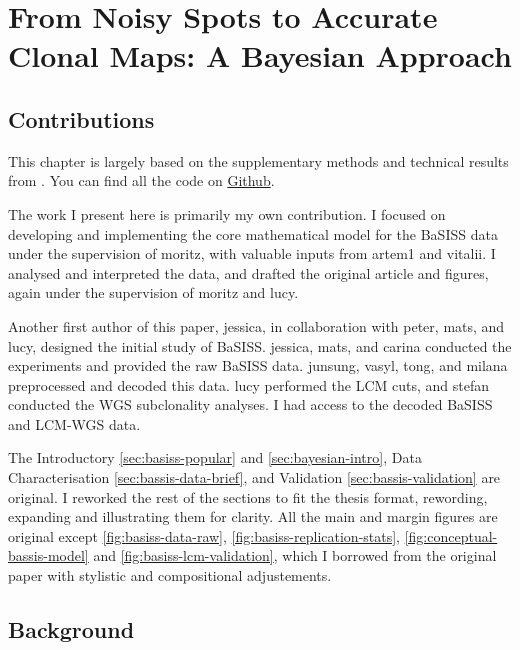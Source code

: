 \chapter{From Noisy Spots to Accurate Clonal Maps: A Bayesian Approach}

\section*{Contributions}
This chapter is largely based on the supplementary methods and technical results from . You can find all the code on \href{https://github.com/gerstung-lab/BaSISS}{Github}.

The work I present here is primarily my own contribution. I focused on developing and implementing the core mathematical model for the \acs{BaSISS} data under the supervision of \ac{moritz}, with valuable inputs from \ac{artem1} and \ac{vitalii}. I analysed and interpreted the data, and drafted the original article and figures, again under the supervision of \ac{moritz} and \ac{lucy}.

Another first author of this paper, \ac{jessica}, in collaboration with \ac{peter}, \ac{mats}, and \ac{lucy}, designed the initial study of \acs{BaSISS}. \ac{jessica}, \ac{mats}, and \ac{carina} conducted the experiments and provided the raw \acs{BaSISS} data. \ac{junsung}, \ac{vasyl}, \ac{tong}, and \ac{milana} preprocessed and decoded this data. \ac{lucy} performed the \acs{LCM} cuts, and \ac{stefan} conducted the \acs{WGS} subclonality analyses. I had access to the decoded \acs{BaSISS} and \acs{LCM}-\acs{WGS} data.

The Introductory \cref{sec:basiss-popular} and \cref{sec:bayesian-intro}, Data Characterisation \cref{sec:bassis-data-brief}, and Validation \cref{sec:bassis-validation} are original. I reworked the rest of the sections to fit the thesis format, rewording, expanding and illustrating them for clarity. All the main and margin figures are original except \cref{fig:basiss-data-raw}, \cref{fig:basiss-replication-stats}, \cref{fig:conceptual-bassis-model} and \cref{fig:basiss-lcm-validation}, which I borrowed from the original paper with stylistic and compositional adjustements. 

\section{Background}
